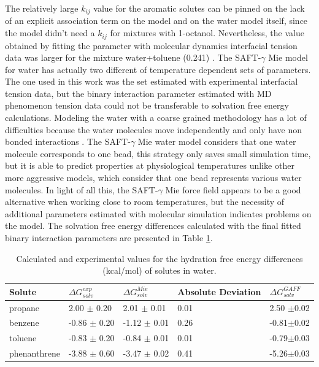 The relatively large $k_{ij}$ value for the aromatic solutes can be pinned on the lack of an explicit association term on the model and on the water model itself, since the model didn't need a $k_{ij}$ for mixtures with 1-octanol. Nevertheless, the value obtained by fitting the parameter with molecular dynamics interfacial tension data was larger for the mixture water+toluene (0.241) \cite{herdes2017}.  The SAFT-$\gamma$ Mie model for water \cite{lobanova2016} has actually two different of temperature dependent sets of parameters. The one used in this work was the set estimated with experimental interfacial tension data, but the binary interaction parameter estimated with MD phenomenon tension data could not be transferable to solvation free energy calculations. Modeling the water with a coarse grained methodology has a lot of difficulties because the water molecules move independently and only have non bonded interactions \cite{hadley2010,hadley2012}. The  SAFT-$\gamma$ Mie water model considers that one water molecule corresponds to one bead, this strategy only saves small simulation time, but it is able to predict properties at physiological temperatures unlike other more aggressive models, which consider that one bead represents various water molecules. In light of all this, the SAFT-$\gamma$ Mie force field appears to be a good alternative when working close to room temperatures, but the necessity of additional parameters estimated with molecular simulation indicates problems on the model. The solvation free energy differences calculated with the final fitted binary interaction parameters are presented in Table \ref{tbl:solv2}.  

\begin{table}[H]
  \centering
  \caption{Calculated and experimental values for the hydration free energy differences  (kcal/mol) of solutes in water.}
  \label{tbl:solv2}
  \begin{tabular}{lllll}
    \hline
     Solute      & $\Delta G_{solv}^{exp}$ & $\Delta G_{solv}^{Mie}$ & Absolute Deviation & $\Delta G_{solv}^{GAFF}$ \\
    \hline
    propane      &  2.00 $\pm$ 0.20 & 2.01 $\pm$ 0.01& 0.01 &2.50 $\pm$0.02 \\
    benzene      & -0.86 $\pm$ 0.20 & -1.12 $\pm$ 0.01    &  0.26    &-0.81$\pm$0.02 \\  
    toluene      & -0.83 $\pm$ 0.20 & -0.84 $\pm$ 0.01   &  0.01    &-0.79$\pm$0.03\\
    phenanthrene & -3.88 $\pm$ 0.60 & -3.47 $\pm$ 0.02& 0.41 &-5.26$\pm$0.03 \\
    \hline
  \end{tabular}

\end{table}

